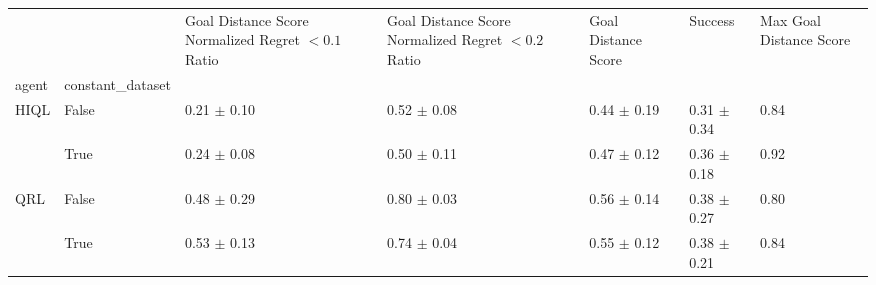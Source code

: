 \begin{tabular}{lllllll}
\toprule
 &  & Goal Distance Score Normalized Regret $< 0.1$ Ratio & Goal Distance Score Normalized Regret $< 0.2$ Ratio & Goal Distance Score & Success & Max Goal Distance Score \\
agent & constant_dataset &  &  &  &  &  \\
\midrule
\multirow[t]{2}{*}{HIQL} & False & 0.21 $\pm$ 0.10 & 0.52 $\pm$ 0.08 & 0.44 $\pm$ 0.19 & 0.31 $\pm$ 0.34 & 0.84 \\
 & True & 0.24 $\pm$ 0.08 & 0.50 $\pm$ 0.11 & 0.47 $\pm$ 0.12 & 0.36 $\pm$ 0.18 & 0.92 \\
\cline{1-7}
\multirow[t]{2}{*}{QRL} & False & 0.48 $\pm$ 0.29 & 0.80 $\pm$ 0.03 & 0.56 $\pm$ 0.14 & 0.38 $\pm$ 0.27 & 0.80 \\
 & True & 0.53 $\pm$ 0.13 & 0.74 $\pm$ 0.04 & 0.55 $\pm$ 0.12 & 0.38 $\pm$ 0.21 & 0.84 \\
\cline{1-7}
\bottomrule
\end{tabular}
